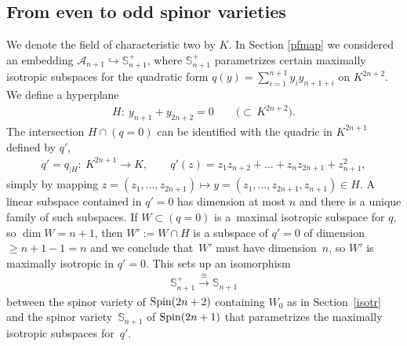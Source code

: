 \documentclass[10pt,a4paper]{amsart}
\newcommand{\bS}{{\mathbb S}}
\newcommand{\cA}{{\cal A}}
\numberwithin{equation}{section}
\providecommand{\cal}{\mathcal}
\begin{document}
\subsection{From even to odd spinor varieties}\label{evenodd}
We denote the field of characteristic two by $K$. In Section \ref{pfmap} we considered an embedding $\cA_{n+1}\hookrightarrow\bS_{n+1}^+$, where $\bS_{n+1}^+$ parametrizes certain maximally isotropic subspaces for the quadratic form $q(y)=\sum\limits_{i=1}^{n+1}y_iy_{n+1+i}$ on $K^{2n+2}$. We define a hyperplane
\begin{gather*}
H\colon \ y_{n+1} + y_{2n+2} = 0 \qquad \big({\subset}\, K^{2n+2}\big).
\end{gather*}
The intersection $H\cap (q=0)$ can be identified with
the quadric in $K^{2n+1}$ defined by $q'$,
\begin{gather*}
q'=q_{|H}\colon \ K^{2n+1} \longrightarrow K,\qquad q'(z) = z_1z_{n+2} +\dots+ z_nz_{2n+1} + z_{n+1}^2,
\end{gather*}
simply by mapping $z=(z_1,\ldots,z_{2n+1})\mapsto y=(z_1,\ldots,z_{2n+1},z_{n+1})\in H$. A linear subspace contained in $q'=0$ has dimension at most $n$ and there is a unique family of such subspaces. If $W\subset (q=0)$ is a~maximal isotropic subspace for $q$, so $\dim W=n+1$, then $W':=W\cap H$ is a subspace of $q'=0$ of dimension $\geq n+1-1=n$ and we conclude that~$W'$ must have dimension~$n$, so $W'$ is maximally isotropic in $q'=0$. This sets up an isomorphism
\begin{gather*}
\bS_{n+1}^+ \stackrel{\cong}{\longrightarrow} \bS_{n+1}
\end{gather*}
between the spinor variety of ${\rm Spin}(2n+2)$ containing $W_0$ as in Section~\ref{isotr} and the spinor variety~$\bS_{n+1}$ of ${\rm Spin}(2n+1)$ that parametrizes the maximally isotropic subspaces for~$q'$.
\end{document}
